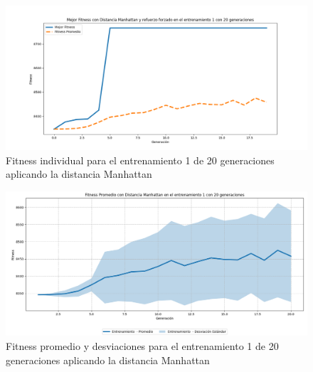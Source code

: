 \documentclass[conference]{IEEEtran}
\begin{document}
\begin{figure}[H]
    \centering
    \includegraphics[width=0.9 \linewidth]{Manhattan/Fitness_individual_20Gen/Fitness_1_Manh_20Gen.png}
    \caption{Fitness individual para el entrenamiento 1 de 20 generaciones aplicando la distancia Manhattan}
    \label{fig:manhattan_1_20}
\end{figure}
\begin{figure}[H]
    \centering
    \includegraphics[width=0.9 \linewidth]{Manhattan/Fitness_individual_20Gen/Fitness_1_Manh_20Gen_Sombra.png}
    \caption{Fitness promedio y desviaciones para el entrenamiento 1 de 20 generaciones aplicando la distancia Manhattan}
    \label{fig:manhattan_1_20_sombra}
\end{figure}
\end{document}
